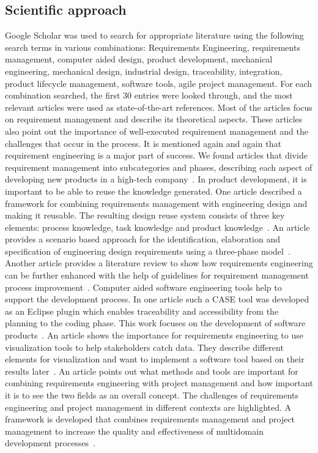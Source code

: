     \subsection*{Scientific approach}
    Google Scholar was used to search for appropriate literature using the following search terms in various combinations: Requirements Engineering, requirements management, computer aided design, product development, mechanical engineering, mechanical design, industrial design, traceability, integration, product lifecycle management, software tools, agile project management. For each combination searched, the first 30 entries were looked through, and the most relevant articles were used as state-of-the-art references. Most of the articles focus on requirement management and describe its theoretical aspects. These articles also point out the importance of well-executed requirement management and the challenges that occur in the process. It is mentioned again and again that requirement engineering is a major part of success.
    We found articles that divide requirement management into subcategories and phases, describing each aspect of developing new products in a high-tech company~\cite{Ahti2005}.
    In product development, it is important to be able to reuse the knowledge generated. One article described a framework for combining requirements management with engineering design and making it reusable. The resulting design reuse system consists of three key elements: process knowledge, task knowledge and product knowledge~\cite{BAXTER2008585}.
    An article provides a scenario based approach for the identification, elaboration and specification of engineering design requirements using a three-phase model~\cite{liu2012scenario}.
    Another article provides a literature review to show how requirements engineering can be further enhanced with the help of guidelines for requirement management process improvement~\cite{Kauppinen2005}.
    Computer aided software engineering tools help to support the development process. In one article such a CASE tool was developed as an Eclipse plugin which enables traceability and accessibility from the planning to the coding phase. This work focuses on the development of software products~\cite{6976693}.
    An article shows the importance for requirements engineering to use visualization tools to help stakeholders catch data. They describe different elements for visualization and want to implement a software tool based on their results later~\cite{RICHTER2020271}.
    An article points out what methods and tools are important for combining requirements engineering with project management and how important it is to see the two fields as an overall concept. The challenges of requirements engineering and project management in different contexts are highlighted. A framework is developed that combines requirements management and project management to increase the quality and effectiveness of multidomain development processes~\cite{Jorma2014}.
